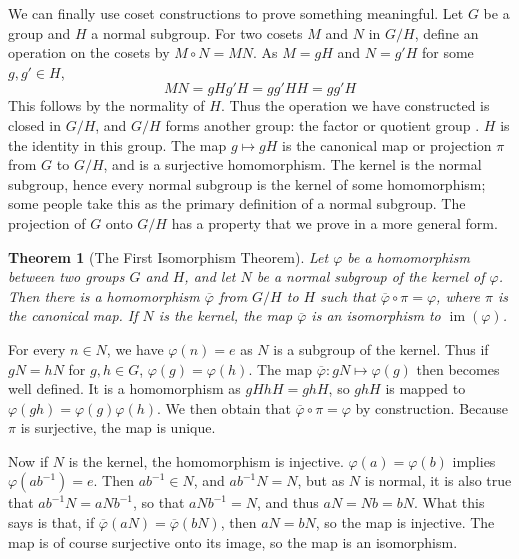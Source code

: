 \documentclass[12pt]{amsbook}
\makeatletter
\theoremstyle{plain}
\newtheorem{theorem}{Theorem}[chapter]
\theoremstyle{definition}
\renewenvironment{proof}[1][\proofname]{\par
  \pushQED{\qed}%
  \normalfont \topsep6\p@\@plus6\p@\relax
  \list{}{\leftmargin=0em
          \rightmargin=\leftmargin
          \settowidth{\itemindent}{\itshape#1}%
          \labelwidth=\itemindent}

  \item[\hskip\labelsep
        \itshape
    #1\@addpunct{.}]\ignorespaces
}{%
  \popQED\endlist\@endpefalse
}
\DeclareMathOperator{\im}{im}
\makeatother
\begin{document}
We can finally use coset constructions to prove something meaningful. Let $G$ be a group and $H$ a normal subgroup. For two cosets $M$ and $N$ in $G/H$, define an operation on the cosets by $M \circ N = MN$. As $M = gH$ and $N = g'H$ for some $g,g' \in H$,
%
\[ MN = gHg'H = gg'HH = gg'H \]
%
This follows by the normality of $H$. Thus the operation we have constructed is closed in $G/H$, and $G/H$ forms another group: the factor or quotient group  . $H$ is the identity in this group. The map $g \mapsto gH$ is the canonical map or projection $\pi$ from $G$ to $G/H$, and is a surjective homomorphism. The kernel is the normal subgroup, hence every normal subgroup is the kernel of some homomorphism; some people take this as the primary definition of a normal subgroup. The projection of $G$ onto $G/H$ has a property that we prove in a more general form.

\begin{theorem}[The First Isomorphism Theorem] 
Let $\varphi$ be a homomorphism between two groups $G$ and $H$, and let $N$ be a normal subgroup of the kernel of $\varphi$. Then there is a homomorphism $\overline{\varphi}$ from $G/H$ to $H$ such that $\overline{\varphi} \circ \pi = \varphi$, where $\pi$ is the canonical map. If $N$ is the kernel, the map $\overline{\varphi}$ is an isomorphism to $\im(\varphi)$.
\end{theorem}
\begin{proof}
    For every $n \in N$, we have $\varphi(n) = e$ as $N$ is a subgroup of the kernel. Thus if $gN = hN$ for $g,h \in G$, $\varphi(g) = \varphi(h)$. The map $\overline{\varphi}: gN \mapsto \varphi(g)$ then becomes well defined. It is a homomorphism as $gHhH = ghH$, so $ghH$ is mapped to $\varphi(gh) = \varphi(g)\varphi(h)$. We then obtain that $\overline{\varphi} \circ \pi = \varphi$ by construction. Because $\pi$ is surjective, the map is unique.

    Now if $N$ is the kernel, the homomorphism is injective. $\varphi(a) = \varphi(b)$ implies $\varphi(ab^{-1}) = e$. Then $ab^{-1} \in N$, and $ab^{-1}N = N$, but as $N$ is normal, it is also true that $ab^{-1}N = aNb^{-1}$, so that $aNb^{-1} = N$, and thus $aN = Nb = bN$. What this says is that, if $\overline{\varphi}(aN) = \overline{\varphi}(bN)$, then $aN = bN$, so the map is injective. The map is of course surjective onto its image, so the map is an isomorphism.
\end{proof}
\end{document}
